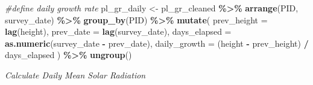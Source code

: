 \documentclass[
]{article}
\newenvironment{Shaded}{\begin{snugshade}}{\end{snugshade}}
\newcommand{\AttributeTok}[1]{\textcolor[rgb]{0.13,0.29,0.53}{#1}}
\newcommand{\CommentTok}[1]{\textcolor[rgb]{0.56,0.35,0.01}{\textit{#1}}}
\newcommand{\ConstantTok}[1]{\textcolor[rgb]{0.56,0.35,0.01}{#1}}
\newcommand{\FunctionTok}[1]{\textcolor[rgb]{0.13,0.29,0.53}{\textbf{#1}}}
\newcommand{\NormalTok}[1]{#1}
\newcommand{\OtherTok}[1]{\textcolor[rgb]{0.56,0.35,0.01}{#1}}
\newcommand{\SpecialCharTok}[1]{\textcolor[rgb]{0.81,0.36,0.00}{\textbf{#1}}}
\begin{document}
\begin{Shaded}
\begin{Highlighting}[]
\CommentTok{\#define daily growth rate}
\NormalTok{pl\_gr\_daily }\OtherTok{\textless{}{-}}\NormalTok{ pl\_gr\_cleaned }\SpecialCharTok{\%\textgreater{}\%}
  \FunctionTok{arrange}\NormalTok{(PID, survey\_date) }\SpecialCharTok{\%\textgreater{}\%}
  \FunctionTok{group\_by}\NormalTok{(PID) }\SpecialCharTok{\%\textgreater{}\%}
  \FunctionTok{mutate}\NormalTok{(}
    \AttributeTok{prev\_height =} \FunctionTok{lag}\NormalTok{(height),}
    \AttributeTok{prev\_date =} \FunctionTok{lag}\NormalTok{(survey\_date),}
    \AttributeTok{days\_elapsed =} \FunctionTok{as.numeric}\NormalTok{(survey\_date }\SpecialCharTok{{-}}\NormalTok{ prev\_date),}
    \AttributeTok{daily\_growth =}\NormalTok{ (height }\SpecialCharTok{{-}}\NormalTok{ prev\_height) }\SpecialCharTok{/}\NormalTok{ days\_elapsed}
\NormalTok{  ) }\SpecialCharTok{\%\textgreater{}\%}
  \FunctionTok{ungroup}\NormalTok{()}
\end{Highlighting}
\end{Shaded}

\emph{Calculate Daily Mean Solar Radiation}

\begin{Shaded}
\end{Shaded}
\end{document}
